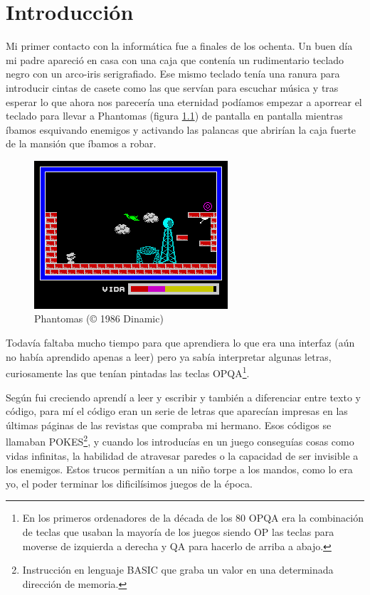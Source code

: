 \chapter{Introducción}

Mi primer contacto con la informática fue a finales de los ochenta. Un buen día mi padre apareció en casa con una caja que contenía un rudimentario teclado negro con un arco-iris serigrafiado. Ese mismo teclado tenía una ranura para introducir cintas de casete como las que servían para escuchar música y tras esperar lo que ahora nos parecería una eternidad podíamos empezar a aporrear el teclado para llevar a Phantomas (figura \ref{fig:phantomas}) de pantalla en pantalla mientras íbamos esquivando enemigos y activando las palancas que abrirían la caja fuerte de la mansión que íbamos a robar.


\begin{figure}[h!]
\centering
\includegraphics{../images/phantomas-sp1}
\caption{Phantomas (© 1986 Dinamic)}
\label{fig:phantomas}
\end{figure}

\bigskip
Todavía faltaba mucho tiempo para que aprendiera lo que era una interfaz (aún no había aprendido apenas a leer) pero ya sabía interpretar algunas letras, curiosamente las que tenían pintadas las teclas OPQA\footnote{En los primeros ordenadores de la década de los 80 OPQA era la combinación de teclas que usaban la mayoría de los juegos siendo OP las teclas para moverse de izquierda a derecha y QA para hacerlo de arriba a abajo.}.

\bigskip
Según fui creciendo aprendí a leer y escribir y también a diferenciar entre texto y código, para mí el código eran un serie de letras que aparecían impresas en las últimas páginas de las revistas que compraba mi hermano. Esos códigos se llamaban POKES\footnote{Instrucción en lenguaje BASIC que graba un valor en una determinada dirección de memoria.}, y cuando los introducías en un juego conseguías cosas como vidas infinitas, la habilidad de atravesar paredes o la capacidad de ser invisible a los enemigos. Estos trucos permitían a un niño torpe a los mandos, como lo era yo, el poder terminar los dificilísimos juegos de la época.

